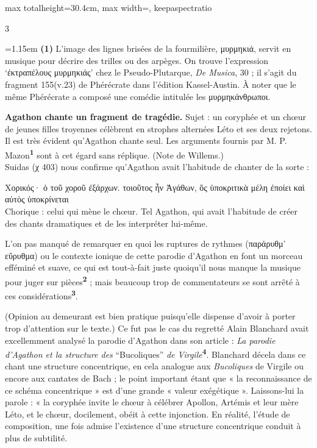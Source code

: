 \documentclass[11pt,twoside]{book}
\newcommand{\italique}[1]{\textit{#1}}
\newcommand{\citComm}[1]{\begin{quoting}[vskip=0.4pt,leftmargin=0.7em,rightmargin=0.2em]#1\end{quoting}}
\newcommand{\francais}[1]{{\policeFr #1}}
\newcommand{\marqueur}[1]{\textsuperscript{\color{rubricRed}\textbf{#1}}}
\begin{document}
\begin{adjustbox}{max totalheight=30.4cm, max width=\textwidth, keepaspectratio}
\begin{minipage}{\textwidth}
{\begin{multicols}{3}
\par\vspace{1.5pt}
\par\vspace{1.2pt}\par\nopagebreak\vspace{1pt}\noindent\hangindent=1.15em {\color{sepiaNote}\textbf{(1)}} L'image des lignes brisées de la fourmilière, μυρμηκιά, servit en musique pour décrire des trilles ou des arpèges. On trouve l'expression `ἐκτραπέλους μυρμηκιάς' chez le Pseudo-Plutarque, \italique{De Musica}, 30 ; il s'agit du fragment 155(v.23) de Phérécrate dans l'édition Kassel-Austin. À noter que le même Phérécrate a composé une comédie intitulée les μυρμηκάνθρωποι.
\par\vspace{1.5pt}
 \textbf{Agathon chante un fragment de tragédie.} Sujet : un coryphée et un chœur de jeunes filles troyennes célèbrent en strophes alternées Léto et ses deux rejetons. Il est très évident qu'Agathon chante seul. Les arguments fournis par M. P. Mazon\marqueur{1} sont à cet égard sans réplique. (Note de Willems.)\\ Suidas (χ 403) nous confirme qu'Agathon avait l'habitude de chanter de la sorte :
\citComm{Χορικός· ὁ τοῦ χοροῦ ἐξάρχων. τοιοῦτος ἦν Ἀγάθων, ὃς ὑποκριτικὰ μέλη ἐποίει καὶ αὐτὸς ὑποκρίνεται\\
\francais{Chorique : celui qui mène le chœur. Tel Agathon, qui avait l'habitude de créer des chants dramatiques et de les interpréter lui-même.}}
\par\vspace{1.5pt}
\noindent L'on pas manqué de remarquer en quoi les ruptures de rythmes (παράρυθμ' εὔρυθμα) ou le contexte ionique de cette parodie d'Agathon en font un morceau efféminé et suave, ce qui est tout-à-fait juste quoiqu'il nous manque la musique pour juger sur pièces\marqueur{2} ; mais beaucoup trop de commentateurs se sont arrêté à ces considérations\marqueur{3}.
\par\vspace{1.5pt}
\noindent (Opinion au demeurant est bien pratique puisqu'elle dispense d'avoir à porter trop d'attention sur le texte.) Ce fut pas le cas du regretté Alain Blanchard avait excellemment analysé la parodie d'Agathon dans son article : \italique{La parodie d'Agathon et la structure des }``Bucoliques''\italique{ de Virgile}\marqueur{4}. Blanchard décela dans ce chant une structure concentrique, en cela analogue aux \italique{Bucoliques} de Virgile ou encore aux cantates de Bach ; le point important étant que « la reconnaissance de ce schéma concentrique » est d'une grande « valeur exégétique ». Laissons-lui la parole : « la coryphée invite le chœur à célébrer Apollon, Artémis et leur mère Léto, et le chœur, docilement, obéit à cette injonction. En réalité, l'étude de composition, une fois admise l'existence d'une structure concentrique conduit à plus de subtilité.

\end{multicols}}
\end{minipage}
\end{adjustbox}
\end{document}
